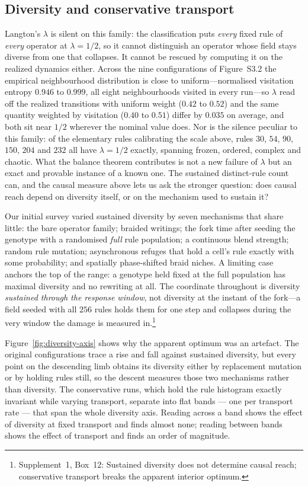 \documentclass[man,12pt,floatsintext,donotrepeattitle]{apa7}
\newcommand{\suppfindingref}[1]{Supplement~1, Box~#1}
\newcommand{\suppfindingtext}[2]{\suppfindingref{#1}: #2.}
\newcommand{\suppfinding}[2]{\footnote{\suppfindingtext{#1}{#2}}}
\begin{document}
\subsection{Diversity and conservative transport}
\label{sec:diversity-axis}

Langton's $\lambda$ is silent on this family: the classification puts
\emph{every} fixed rule of \emph{every} operator at $\lambda = 1/2$, so it
cannot distinguish an operator whose field stays diverse from one that
collapses. It cannot be rescued by computing it on the realized dynamics
either. Across the nine configurations of
Figure~S3.2 the empirical neighbourhood distribution is
close to uniform---normalised visitation entropy $0.946$ to $0.999$, all eight
neighbourhoods visited in every run---so $\lambda$ read off the realized
transitions with uniform weight ($0.42$ to $0.52$) and the same quantity
weighted by visitation ($0.40$ to $0.51$) differ by $0.035$ on average, and both
sit near $1/2$ wherever the nominal value does. Nor is the silence peculiar to
this family: of the elementary rules calibrating the scale above, rules $30$,
$54$, $90$, $150$, $204$ and $232$ all have $\lambda = 1/2$ exactly, spanning
frozen, ordered, complex and chaotic. What the balance theorem contributes is
not a new failure of $\lambda$ but an exact and provable instance of a known
one. The sustained distinct-rule count can, and the causal measure above
lets us ask the stronger question: does causal reach depend on diversity
itself, or on the mechanism used to sustain it?

Our initial survey varied sustained diversity by seven mechanisms that share little: the bare
operator family; braided writings; the fork time after seeding the genotype with
a randomised \emph{full} rule population; a continuous blend strength; random
rule mutation; asynchronous refuges that hold a cell's rule exactly with some
probability; and spatially phase-shifted braid niches. A limiting case anchors
the top of the range: a genotype held fixed at the full population has maximal
diversity and no rewriting at all. The coordinate throughout is diversity
\emph{sustained through the response window}, not diversity at the instant of
the fork---a field seeded with all $256$ rules holds them for one step and
collapses during the very window the damage is measured in.\suppfinding{12}{Sustained diversity does not determine causal reach; conservative transport breaks the apparent interior optimum}

Figure~\ref{fig:diversity-axis} shows why the apparent optimum was an artefact.
The original configurations trace a rise and fall against sustained diversity,
but every point on the descending limb obtains its diversity either by
replacement mutation or by holding rules still, so the descent measures those
two mechanisms rather than diversity. The conservative runs, which hold the rule
histogram exactly invariant while varying transport, separate into flat bands
--- one per transport rate --- that span the whole diversity axis. Reading
across a band shows the effect of diversity at fixed transport and finds almost
none; reading between bands shows the effect of transport and finds an order of
magnitude.
\end{document}

